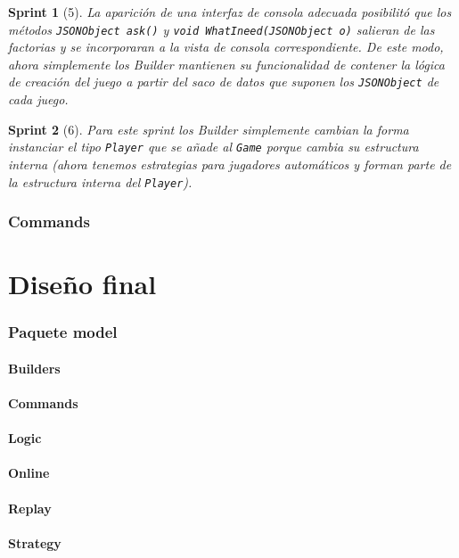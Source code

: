 \documentclass[12pt,a4paper,openright]{book}
\theoremstyle{break}
\newtheorem*{sprint}{Sprint}
\begin{document}
\begin{sprint}[5]
La aparición de una interfaz de consola adecuada posibilitó que los métodos \texttt{JSONObject ask()} y \texttt{void WhatIneed(JSONObject o)} salieran de las factorias y se incorporaran a la vista de consola correspondiente. De este modo, ahora simplemente los Builder mantienen su funcionalidad de contener la lógica de creación del juego a partir del saco de datos que suponen los \texttt{JSONObject} de cada juego.
\end{sprint}

\begin{sprint}[6]
Para este sprint los Builder simplemente cambian la forma instanciar el tipo \texttt{Player} que se añade al \texttt{Game} porque cambia su estructura interna (ahora tenemos estrategias para jugadores automáticos y forman parte de la estructura interna del \texttt{Player}).
\end{sprint}

\subsection{Commands}

\chapter{Diseño final}

\subsection{Paquete model}
\subsubsection{Builders}
\subsubsection{Commands}
\subsubsection{Logic}
\subsubsection{Online}
\subsubsection{Replay}
\subsubsection{Strategy}
\end{document}
